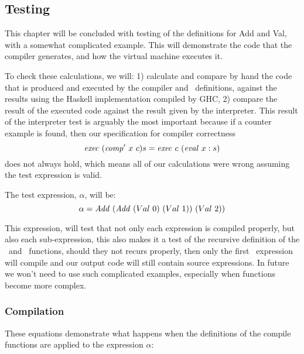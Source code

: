 \documentclass {article}
\begin{document}
\subsection{Testing}

This chapter will be concluded 
with testing
of the definitions for Add and Val, with a somewhat complicated
example.
This will demonstrate the code that the
compiler generates, and how the virtual machine executes it.

To check these calculations, we will:
1) calculate and compare by hand 
the code that is produced and executed
by the compiler and \vm\ definitions, 
against the results using the Haskell implementation
compiled by GHC,
2) compare the result of the executed code against the result
given by the interpreter. 
This result of the interpreter test is arguably the most
important because if a counter example is found,
then our specification for compiler correctness 
\[ \mathit{exec\ } (\mathit{comp'\ }  x\ c) s = \mathit{exec\ } c\ (\mathit{eval\ }  x : s) \]
does not always hold, 
which means all of our calculations were wrong
assuming the test expression is valid.

The test expression, $\alpha$, will be:
\[ \alpha = \Add (\Add (Val\ 0)\ (Val\ 1))\ (Val\ 2)) \]

This expression, 
will test that not only each expression
is compiled properly, but also each sub-expression,
this also makes it a test of the
recursive definition of the \comp\ and \compp\ functions,
should they not recurs properly, then only the first
\add\ expression will compile and our output code will
still contain source expressions. 
In future we won't need to use such complicated examples, 
especially when functions become more complex.

\subsubsection{Compilation}

These equations demonstrate what happens
when the definitions of the compile functions are applied to
the expression $\alpha$:
\end{document}
